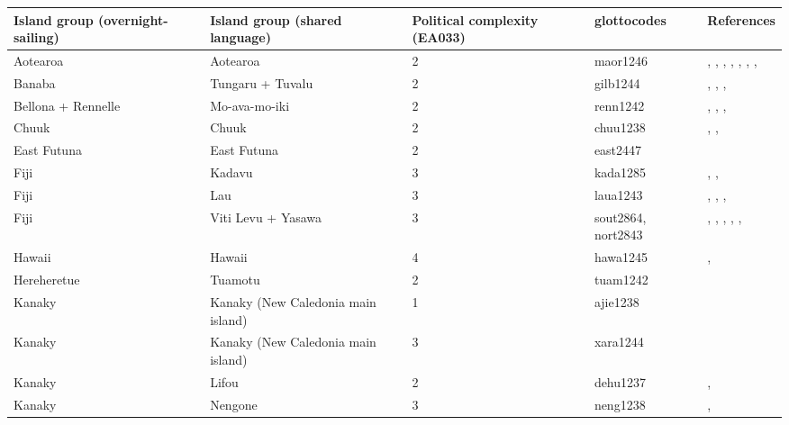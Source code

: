 \begin{longtable}{p{4.5cm}p{2cm}p{2cm}p{2cm}p{4cm}}
  \toprule
Island group (overnight-sailing) & Island group (shared language) & Political complexity (EA033) & glottocodes & References \\ 
  \midrule
Aotearoa & Aotearoa & 2 & maor1246 & \citet{sahlins1958social}, \citet{sahlins1958social}, \citet{buck1952}, \citet{buck1952}, \citet{kirch1984evolution}, \citet{kirch1984evolution}, \citet{van1995maori}, \citet{van1995maori} \\ 
  Banaba & Tungaru + Tuvalu & 2 & gilb1244 & \citet{lambert1966}, \citet{lambert1975makin}, \citet{lambert1991}, \citet{macdonald1982cinderellas} \\ 
  Bellona + Rennelle & Mo-ava-mo-iki & 2 & renn1242 & \citet{birketsmith1956}, \citet{birketsmith1956}, \citet{monberg1991bellona}, \citet{monberg1991bellona} \\ 
  Chuuk & Chuuk & 2 & chuu1238 & \citet{goodenough1991}, \citet{goodenough2002under}, \citet{mahony1960taro} \\ 
  East Futuna & East Futuna & 2 & east2447 & \citet{kirch1994wet} \\ 
  Fiji & Kadavu & 3 & kada1285 & \citet{kuhlken2002intensive}, \citet{scarr1984fiji}, \citet{walter1978examination} \\ 
  Fiji & Lau & 3 & laua1243 & \citet{hocart_1929}, \citet{quain_1948}, \citet{thompson1940a}, \citet{thompson1940b} \\ 
  Fiji & Viti Levu + Yasawa & 3 & sout2864, nort2843 & \citet{kuhlken2002intensive}, \citet{kuhlken2002intensive}, \citet{scarr1984fiji}, \citet{scarr1984fiji}, \citet{walter1978examination}, \citet{walter1978examination} \\ 
  Hawaii & Hawaii & 4 & hawa1245 & \citet{kirch1994wet}, \citet{kirch2010chiefs} \\ 
  Hereheretue & Tuamotu & 2 & tuam1242 & \citet{emory1975material} \\ 
  Kanaky & Kanaky (New Caledonia main island) & 1 & ajie1238 & \citet{winslow1991} \\ 
  Kanaky & Kanaky (New Caledonia main island) & 3 & xara1244 & \citet{young1991goodenough} \\ 
  Kanaky & Lifou & 2 & dehu1237 & \citet{hadfield_1920}, \citet{ray1917people} \\ 
  Kanaky & Nengone & 3 & neng1238 & \citet{dubois1984gens}, \citet{guiart1952organisation} \\ 

\end{longtable}
